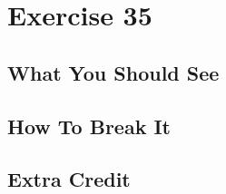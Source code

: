 \chapter{Exercise 35}


\section{What You Should See}


\section{How To Break It}


\section{Extra Credit}



